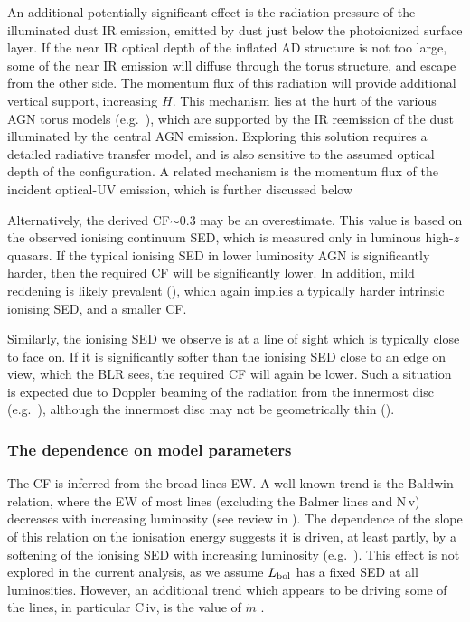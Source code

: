 \documentclass[a4paper,fleqn,usenatbib]{mnras}
\newcommand{\NV}{\mbox{N\,{\sc v}}}
\newcommand{\CIV}{\mbox{C\,{\sc iv}}}
\begin{document}
An additional potentially significant effect is the radiation pressure of the illuminated 
dust IR emission, emitted by dust just below the photoionized surface layer.  
If the near IR optical depth of the inflated AD structure is not too large, some
of the near IR emission will diffuse through the torus structure, and escape from the other side.
The momentum flux of this radiation will provide additional vertical support, increasing $H$.
This mechanism lies at the hurt of the various AGN torus models (e.g.\ \citealt{Chan16}), 
which are supported by the IR reemission of the dust illuminated by the central AGN emission. 
Exploring this 
solution requires a detailed radiative transfer model,
and is also sensitive to the assumed optical depth of the configuration. 
A related mechanism is the momentum flux of the incident optical-UV emission, 
which is further discussed below 

Alternatively, the derived CF$\sim 0.3$ may be an overestimate. This value is based on the 
observed ionising continuum SED, which is measured only in luminous high-$z$ quasars. If the typical 
ionising SED in lower luminosity AGN is significantly harder, then the required CF will be significantly lower. 
In addition, mild reddening is likely prevalent (\citealt{SL12, Baron16}), which again implies a typically harder intrinsic ionising 
SED, and a smaller CF.


Similarly, the ionising SED we observe is at a line of sight which is typically close to face on. 
If it is significantly softer than the ionising
SED close to an edge on view, which the BLR sees, the required CF will again be lower. Such 
a situation is expected due to Doppler beaming of the radiation from the innermost disc
(e.g.\ \citealt{LaorNetzer89}), although the innermost disc may not be
geometrically thin (\citealt{LaorDavis14}).



\subsubsection{The dependence on model parameters}

The CF is inferred from the broad lines EW. A well known trend
is the Baldwin relation, where the EW of most lines (excluding the Balmer lines and \NV) decreases
with increasing luminosity (see review in \citealt{Osmer99}). The dependence of the slope of this relation
on the ionisation energy suggests it is driven, at least partly, by a softening of the ionising SED with
increasing luminosity (e.g.\ \citealt{Scott04}). This effect is not explored in the current analysis,
as we assume $L_{\rm bol}$ has a fixed SED at all luminosities. However, an additional trend which
appears to be driving some of the lines, in particular \CIV, is the value of $\dot{m}$ 
\citep*{Baskin04, Warner04, Bachev04}. 
\end{document}

